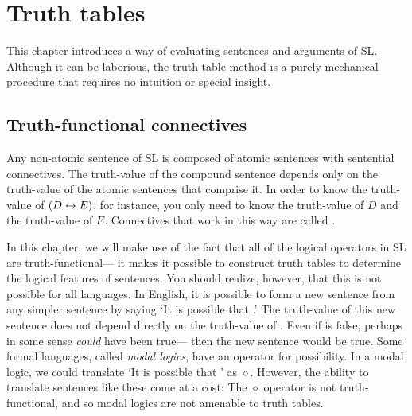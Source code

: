 \chapter{Truth tables}
\label{ch.TruthTables}

This chapter introduces a way of evaluating sentences and arguments of SL. Although it can be laborious, the truth table method is a purely mechanical procedure that requires no intuition or special insight.

\section{Truth-functional connectives}

Any non-atomic sentence of SL is composed of atomic sentences with sentential connectives. The truth-value of the compound sentence depends only on the truth-value of the atomic sentences that comprise it. In order to know the truth-value of $(D\leftrightarrow E)$, for instance, you only need to know the truth-value of $D$ and the truth-value of $E$. Connectives that work in this way are called .

In this chapter, we will make use of the fact that all of the logical operators in SL are truth-functional--- it makes it possible to construct truth tables to determine the logical features of sentences. You should realize, however, that this is not possible for all languages. In English, it is possible to form a new sentence from any simpler sentence  by saying `It is possible that .' The truth-value of this new sentence does not depend directly on the truth-value of . Even if  is false, perhaps in some sense  \emph{could} have been true--- then the new sentence would be true. Some formal languages, called \emph{modal logics}, have an operator for {possibility}. In a modal logic, we could translate `It is possible that ' as {\large $\diamond$}. However, the ability to translate sentences like these come at a cost: The {\large $\diamond$} operator is not truth-functional, and so modal logics are not amenable to truth tables.


